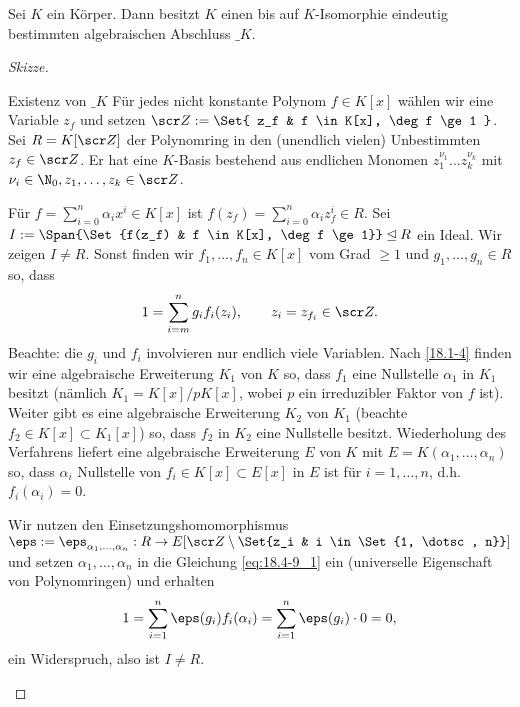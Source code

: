 \begin{st} \label{18.4-9}
	Sei $K$ ein Körper.
	Dann besitzt $K$ einen bis auf $K$-Isomorphie eindeutig bestimmten algebraischen Abschluss $\_K$.
	\begin{proof}[Skizze]
		\begin{seg}{Existenz von $\_K$}
			Für jedes nicht konstante Polynom $f \in K[x]$ wählen wir eine Variable $z_f$ und setzen $\scr Z := \Set{ z_f & f \in K[x], \deg f \ge 1 }$.
			Sei $R = K[\scr Z]$ der Polynomring in den (unendlich vielen) Unbestimmten $z_f \in \scr Z$.
			Er hat eine $K$-Basis bestehend aus endlichen Monomen $z_1^{\nu_1} \dotsc z_k^{\nu_k}$ mit $\nu_i \in \N_0, z_1, \dotsc, z_k \in \scr Z$.

			Für $f = \sum_{i=0}^n \alpha_i x^i \in K[x]$ ist $f(z_f) = \sum_{i=0}^n \alpha_i z_f^i \in R$.
			Sei $I := \Span{\Set{f(z_f) & f \in K[x], \deg f \ge 1}} \IdealOf R$ ein Ideal.
			Wir zeigen $I \neq R$.
			Sonst finden wir $f_1, \dotsc, f_n \in K[x]$ vom Grad $\ge 1$ und $g_1, \dotsc, g_n \in R$ so, dass
			\begin{equation} \label{eq:18.4-9_1}
				1 = \sum_{i=m}^n g_i f_i (z_i),
				\qquad z_i = z_{f_i} \in \scr Z.
			\end{equation}
			Beachte: die $g_i$ und $f_i$ involvieren nur endlich viele Variablen.
			Nach \ref{18.1-4} finden wir eine algebraische Erweiterung $K_1$ von $K$ so, dass $f_1$ eine Nullstelle $\alpha_1$ in $K_1$ besitzt (nämlich $K_1 = K[x] / pK[x]$, wobei $p$ ein irreduzibler Faktor von $f$ ist).
			Weiter gibt es eine algebraische Erweiterung $K_2$ von $K_1$ (beachte $f_2 \in K[x] \subset K_1[x]$) so, dass $f_2$ in $K_2$ eine Nullstelle besitzt.
			Wiederholung des Verfahrens liefert eine algebraische Erweiterung $E$ von $K$ mit $E = K(\alpha_1, \dotsc, \alpha_n)$ so, dass $\alpha_i$ Nullstelle von $f_i \in K[x] \subset E[x]$ in $E$ ist für $i = 1, \dotsc, n$, d.h. $f_i(\alpha_i) = 0$.

			Wir nutzen den Einsetzungshomomorphismus $\eps := \eps_{\alpha_1,\dotsc, \alpha_n} : R \to E[\scr Z \setminus \Set{z_i & i \in \Set{1, \dotsc, n}}]$ und setzen $\alpha_1, \dotsc, \alpha_n$ in die Gleichung \eqref{eq:18.4-9_1} ein (universelle Eigenschaft von Polynomringen) und erhalten
			\[
				1 = \sum_{i=1}^n \eps(g_i) f_i(\alpha_i)
				= \sum_{i=1}^n \eps(g_i) \cdot 0
				= 0,
			\]
			ein Widerspruch, also ist $I \neq R$.


\end{seg}
\end{proof}
\end{st}
